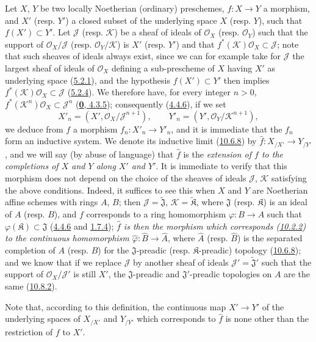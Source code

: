 \begin{env}[10.9.1]
\label{I.10.9.1}
Let $X$, $Y$ be two locally Noetherian (ordinary) preschemes,
$f:X\to Y$ a morphism, and $X'$ (resp. $Y'$) a closed subset of the
underlying space $X$ (resp. $Y$), such that $f(X')\subset Y'$. Let
$\mathscr{J}$ (resp. $\mathscr{K}$) be a sheaf of ideals of
$\mathscr{O}_X$ (resp. $\mathscr{O}_Y$) such that the support of
$\mathscr{O}_X/\mathscr{J}$ (resp. $\mathscr{O}_Y/\mathscr{K}$) is
$X'$ (resp. $Y'$) and that
$f^*(\mathscr{K})\mathscr{O}_X\subset\mathscr{J}$; note that such
sheaves of ideals always exist, since we can for example take for
$\mathscr{J}$ the largest sheaf of ideals of $\mathscr{O}_X$
defining a sub-prescheme of $X$ having $X'$ as underlying space
(\hyperref[I.5.2.1]{5.2.1}), and the hypothesis $f(X')\subset Y'$ then
implies $f^*(\mathscr{K})\mathscr{O}_X\subset\mathscr{J}$
(\hyperref[I.5.2.4]{5.2.4}). We therefore have, for every integer
$n>0$, $f^*(\mathscr{K}^n)\mathscr{O}_X\subset\mathscr{J}^n$
(\hyperref[0.4.3.5]{\textbf{0}, 4.3.5}); consequently
(\hyperref[I.4.4.6]{4.4.6}), if we set
\[
  X'_n=(X',\mathscr{O}_X/\mathscr{J}^{n+1}),\qquad
  Y'_n=(Y',\mathscr{O}_Y/\mathscr{K}^{n+1}),
\]
we deduce from $f$ a morphism $f_n:X'_n\to Y'_n$, and it is immediate
that the $f_n$ form an inductive system. We denote its inductive limit
(\hyperref[I.10.6.8]{10.6.8}) by
$\widehat f:X_{/X'}\to Y_{/Y'}$, and we will say (by abuse of language)
that $\widehat f$ is the \emph{extension of $f$ to the completions of
$X$ and $Y$ along $X'$ and $Y'$}. It is immediate to verify that this
morphism does not depend on the choice of the sheaves of ideals
$\mathscr{J}$, $\mathscr{K}$ satisfying the above conditions. Indeed, it
suffices to see this when $X$ and $Y$ are Noetherian affine schemes with
rings $A$, $B$; then
$\mathscr{J}=\widetilde{\mathfrak{J}}$,
$\mathscr{K}=\widetilde{\mathfrak{K}}$, where $\mathfrak{J}$ (resp.
$\mathfrak{K}$) is an ideal of $A$ (resp. $B$), and $f$ corresponds to a
ring homomorphism $\varphi:B\to A$ such that
$\varphi(\mathfrak{K})\subset\mathfrak{J}$
(\hyperref[I.4.4.6]{4.4.6} and
\hyperref[I.1.7.4]{1.7.4}); \emph{$\widehat f$ is then the morphism
which corresponds (\hyperref[I.10.2.2]{10.2.2}) to the continuous
homomorphism $\widehat\varphi:\widehat B\to\widehat A$}, where
$\widehat A$ (resp. $\widehat B$) is the separated completion of $A$
(resp. $B$) for the $\mathfrak{J}$-preadic (resp. $\mathfrak{K}$-preadic)
topology (\hyperref[I.10.6.8]{10.6.8}); and we know that if we
replace $\mathscr{J}$ by another
sheaf of ideals
$\mathscr{J}'=\widetilde{\mathfrak{J}}'$ such that the support of
$\mathscr{O}_X/\mathscr{J}'$ is still $X'$, the
$\mathfrak{J}$-preadic and $\mathfrak{J}'$-preadic topologies on $A$
are the same (\hyperref[I.10.8.2]{10.8.2}).

Note that, according to this definition, the continuous map
$X'\to Y'$ of the underlying spaces of $X_{/X'}$ and $Y_{/Y'}$ which
corresponds to $\widehat f$ is none other than the restriction of $f$ to
$X'$.
\end{env}

